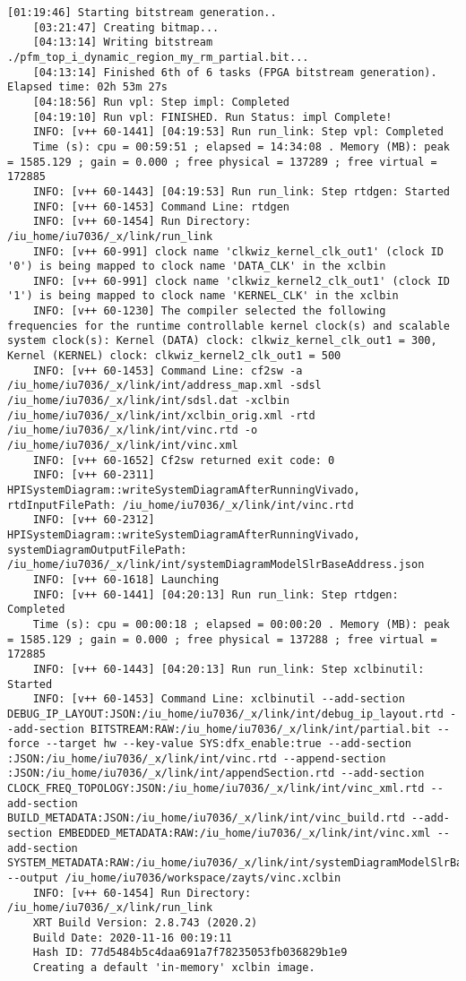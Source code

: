 \begin{lstlisting}[caption=Содержимое файла v++\_vinc.log, label={log1}]
	[01:19:46] Starting bitstream generation..
	[03:21:47] Creating bitmap...
	[04:13:14] Writing bitstream ./pfm_top_i_dynamic_region_my_rm_partial.bit...
	[04:13:14] Finished 6th of 6 tasks (FPGA bitstream generation). Elapsed time: 02h 53m 27s 
	[04:18:56] Run vpl: Step impl: Completed
	[04:19:10] Run vpl: FINISHED. Run Status: impl Complete!
	INFO: [v++ 60-1441] [04:19:53] Run run_link: Step vpl: Completed
	Time (s): cpu = 00:59:51 ; elapsed = 14:34:08 . Memory (MB): peak = 1585.129 ; gain = 0.000 ; free physical = 137289 ; free virtual = 172885
	INFO: [v++ 60-1443] [04:19:53] Run run_link: Step rtdgen: Started
	INFO: [v++ 60-1453] Command Line: rtdgen
	INFO: [v++ 60-1454] Run Directory: /iu_home/iu7036/_x/link/run_link
	INFO: [v++ 60-991] clock name 'clkwiz_kernel_clk_out1' (clock ID '0') is being mapped to clock name 'DATA_CLK' in the xclbin
	INFO: [v++ 60-991] clock name 'clkwiz_kernel2_clk_out1' (clock ID '1') is being mapped to clock name 'KERNEL_CLK' in the xclbin
	INFO: [v++ 60-1230] The compiler selected the following frequencies for the runtime controllable kernel clock(s) and scalable system clock(s): Kernel (DATA) clock: clkwiz_kernel_clk_out1 = 300, Kernel (KERNEL) clock: clkwiz_kernel2_clk_out1 = 500
	INFO: [v++ 60-1453] Command Line: cf2sw -a /iu_home/iu7036/_x/link/int/address_map.xml -sdsl /iu_home/iu7036/_x/link/int/sdsl.dat -xclbin /iu_home/iu7036/_x/link/int/xclbin_orig.xml -rtd /iu_home/iu7036/_x/link/int/vinc.rtd -o /iu_home/iu7036/_x/link/int/vinc.xml
	INFO: [v++ 60-1652] Cf2sw returned exit code: 0
	INFO: [v++ 60-2311] HPISystemDiagram::writeSystemDiagramAfterRunningVivado, rtdInputFilePath: /iu_home/iu7036/_x/link/int/vinc.rtd
	INFO: [v++ 60-2312] HPISystemDiagram::writeSystemDiagramAfterRunningVivado, systemDiagramOutputFilePath: /iu_home/iu7036/_x/link/int/systemDiagramModelSlrBaseAddress.json
	INFO: [v++ 60-1618] Launching 
	INFO: [v++ 60-1441] [04:20:13] Run run_link: Step rtdgen: Completed
	Time (s): cpu = 00:00:18 ; elapsed = 00:00:20 . Memory (MB): peak = 1585.129 ; gain = 0.000 ; free physical = 137288 ; free virtual = 172885
	INFO: [v++ 60-1443] [04:20:13] Run run_link: Step xclbinutil: Started
	INFO: [v++ 60-1453] Command Line: xclbinutil --add-section DEBUG_IP_LAYOUT:JSON:/iu_home/iu7036/_x/link/int/debug_ip_layout.rtd --add-section BITSTREAM:RAW:/iu_home/iu7036/_x/link/int/partial.bit --force --target hw --key-value SYS:dfx_enable:true --add-section :JSON:/iu_home/iu7036/_x/link/int/vinc.rtd --append-section :JSON:/iu_home/iu7036/_x/link/int/appendSection.rtd --add-section CLOCK_FREQ_TOPOLOGY:JSON:/iu_home/iu7036/_x/link/int/vinc_xml.rtd --add-section BUILD_METADATA:JSON:/iu_home/iu7036/_x/link/int/vinc_build.rtd --add-section EMBEDDED_METADATA:RAW:/iu_home/iu7036/_x/link/int/vinc.xml --add-section SYSTEM_METADATA:RAW:/iu_home/iu7036/_x/link/int/systemDiagramModelSlrBaseAddress.json --output /iu_home/iu7036/workspace/zayts/vinc.xclbin
	INFO: [v++ 60-1454] Run Directory: /iu_home/iu7036/_x/link/run_link
	XRT Build Version: 2.8.743 (2020.2)
	Build Date: 2020-11-16 00:19:11
	Hash ID: 77d5484b5c4daa691a7f78235053fb036829b1e9
	Creating a default 'in-memory' xclbin image.
	

\end{lstlisting}
